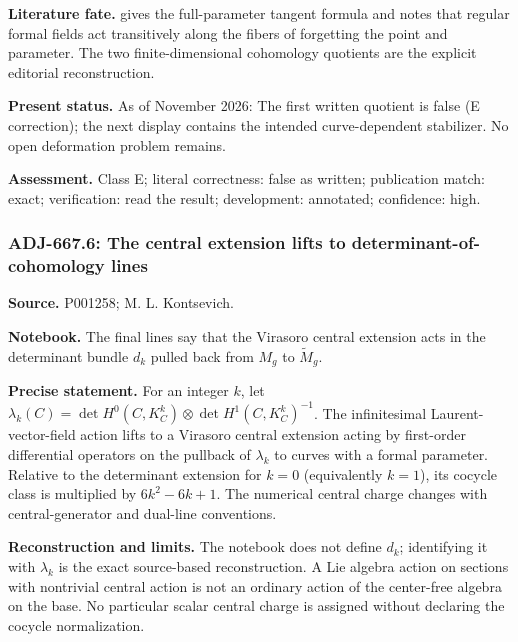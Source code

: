 \noindent\textbf{Literature fate.} \citet[\S1]{kontsevich1987virasoro} gives the full-parameter tangent formula and notes that regular formal fields act transitively along the fibers of forgetting the point and parameter. The two finite-dimensional cohomology quotients are the explicit editorial reconstruction.\par

\noindent\textbf{Present status.} As of November 2026: The first written quotient is false (E correction); the next display contains the intended curve-dependent stabilizer. No open deformation problem remains.\par

\noindent\textbf{Assessment.} Class E; literal correctness: false as written; publication match: exact; verification: read the result; development: annotated; confidence: high.\par

\subsubsection{ADJ-667.6: The central extension lifts to determinant-of-cohomology lines}
\noindent\textbf{Source.} P001258; M. L. Kontsevich.\par
\noindent\textbf{Notebook.} The final lines say that the Virasoro central extension acts in the determinant bundle \(d_k\) pulled back from \(M_g\) to \(\widetilde M_g\).\par

\noindent\textbf{Precise statement.} For an integer \(k\), let \(\lambda_k(C)=\det H^0(C,K_C^k)\otimes\det H^1(C,K_C^k)^{-1}\). The infinitesimal Laurent-vector-field action lifts to a Virasoro central extension acting by first-order differential operators on the pullback of \(\lambda_k\) to curves with a formal parameter. Relative to the determinant extension for \(k=0\) (equivalently \(k=1\)), its cocycle class is multiplied by \(6k^2-6k+1\). The numerical central charge changes with central-generator and dual-line conventions.\par

\noindent\textbf{Reconstruction and limits.} The notebook does not define \(d_k\); identifying it with \(\lambda_k\) is the exact source-based reconstruction. A Lie algebra action on sections with nontrivial central action is not an ordinary action of the center-free algebra on the base. No particular scalar central charge is assigned without declaring the cocycle normalization.\par


